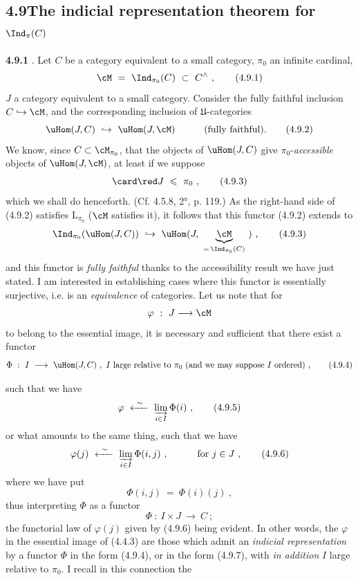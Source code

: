 
\subsection*{4.9\quad The indicial representation theorem for $\Ind_{\pi}(C)$}

\textbf{4.9.1} . Let $C$ be a category equivalent to a small category, $\pi_0$ an infinite cardinal,
\[
\cM \ = \ \Ind_{\pi_0}(C) \ \subset\ C^{\wedge}\ , \tag*{(4.9.1)}
\]
$J$ a category equivalent to a small category. Consider the fully faithful inclusion $C \hookrightarrow \cM$, and the corresponding inclusion of $\mathfrak{U}$-categories
\[
\uHom(J, C) \ \hookrightarrow\ \uHom(J, \cM) \qquad\quad \text{(fully faithful).} \tag*{(4.9.2)}
\]
We know, since $C \subset \cM_{\pi_0}$, that the objects of $\uHom(J, C)$ give $\pi_0$-\textit{accessible} objects of $\uHom(J, \cM)$, at least if we suppose
\[
\card\red J \ \leqslant\ \pi_0\ , \tag*{(4.9.3)}
\]
which we shall do henceforth. (Cf. 4.5.8, 2°, p. 119.) As the right-hand side of (4.9.2) satisfies $\mathrm{L}_{\pi_0}$ ($\cM$ satisfies it), it follows that this functor (4.9.2) extends to
\[
\Ind_{\pi_0}(\uHom(J, C)) \ \hookrightarrow\ \uHom(J,\ \underbrace{\cM}_{=\,\Ind_{\pi_0}(C)}\ )\ , \tag*{(4.9.3)}
\]
and this functor is \textit{fully faithful} thanks to the accessibility result we have just stated. I am interested in establishing cases where this functor is essentially surjective, i.e. is an \textit{equivalence} of categories. Let us note that for
\[
\varphi \ :\ J \longrightarrow \cM
\]
to belong to the essential image, it is necessary and sufficient that there exist a functor
\[
\Phi \ :\ I \ \longrightarrow\ \uHom(J, C)\ ,\ I \text{ large relative to } \pi_0 \text{ (and we may suppose } I \text{ ordered)}\ , \tag*{(4.9.4)}
\]


such that we have
\[
\varphi \ \xleftarrow{\ \sim\ }\ \varinjlim_{i\in I} \Phi(i)\ , \tag*{(4.9.5)}
\]
or what amounts to the same thing, such that we have
\[
\varphi(j) \ \xleftarrow{\ \sim\ }\ \varinjlim_{i\in I} \Phi(i, j)\ , \qquad\quad \text{for } j \in J\ , \tag*{(4.9.6)}
\]
where we have put
\[
\Phi(i, j) \ = \ \Phi(i)(j)\ ,
\]
thus interpreting $\Phi$ as a functor
\[
\Phi \ :\ I \times J \ \longrightarrow\ C\ ; \tag*{(4.9.7)}
\]
the functorial law of $\varphi(j)$ given by (4.9.6) being evident. In other words, the $\varphi$ in the essential image of (4.4.3) are those which admit an \textit{indicial representation} by a functor $\Phi$ in the form (4.9.4), or in the form (4.9.7), with \textit{in addition} $I$ large relative to $\pi_0$. I recall in this connection the %

